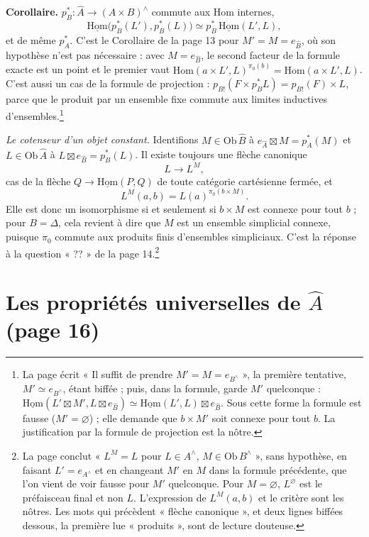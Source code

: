 \documentclass[11pt,a4paper]{article}
\begin{document}
\textbf{Corollaire.} $p_{B}^{*} : \widehat{A} \to (A \times B)^{\wedge}$
commute aux Hom internes,
\[
\underline{\mathrm{Hom}}\bigl(p_{B}^{*}(L'), p_{B}^{*}(L)\bigr) \simeq
p_{B}^{*}\, \underline{\mathrm{Hom}}(L', L),
\]
et de même $p_{A}^{*}$. C'est le Corollaire de la page 13 pour $M' = M =
e_{\widehat{B}}$, où son hypothèse n'est pas nécessaire : avec $M =
e_{\widehat{B}}$, le second facteur de la formule exacte est un point et le
premier vaut $\mathrm{Hom}(a \times L', L)^{\pi_{0}(b)} = \mathrm{Hom}(a
\times L', L)$. C'est aussi un cas de la formule de projection :
$p_{B!}(F \times p_{B}^{*}L) = p_{B!}(F) \times L$, parce que le produit par un
ensemble fixe commute aux limites inductives d'ensembles.\footnote{La page
écrit « Il suffit de prendre $M' = M = e_{B^{\wedge}}$ », la première
tentative, $M' \simeq e_{B^{\wedge}}$, étant biffée ; puis, dans la formule,
garde $M'$ quelconque :
$\underline{\mathrm{Hom}}(L' \boxtimes M', L \boxtimes e_{\widehat{B}}) \simeq
\underline{\mathrm{Hom}}(L', L) \boxtimes e_{\widehat{B}}$. Sous cette forme
la formule est fausse ($M' = \varnothing$) ; elle demande que $b \times M'$
soit connexe pour tout $b$. La justification par la formule de projection est
la nôtre.}

\emph{Le cotenseur d'un objet constant.} Identifions $M \in \mathrm{Ob}\,
\widehat{B}$ à $e_{\widehat{A}} \boxtimes M = p_{A}^{*}(M)$ et $L \in \mathrm{Ob}\,
\widehat{A}$ à $L \boxtimes e_{\widehat{B}} = p_{B}^{*}(L)$. Il existe
toujours une flèche canonique
\[
L \longrightarrow L^{M},
\]
cas de la flèche $Q \to \underline{\mathrm{Hom}}(P, Q)$ de toute catégorie
cartésienne fermée, et
\[
L^{M}(a, b) = L(a)^{\pi_{0}(b \times M)} .
\]
Elle est donc un isomorphisme si et seulement si $b \times M$ est connexe pour
tout $b$ ; pour $B = \Delta$, cela revient à dire que $M$ est un ensemble
simplicial connexe, puisque $\pi_{0}$ commute aux produits finis d'ensembles
simpliciaux. C'est la réponse à la question « ?? » de la page 14.\footnote{La
page conclut « $L^{M} = L$ pour $L \in A^{\wedge}$, $M \in \mathrm{Ob}\,
B^{\wedge}$ », sans hypothèse, en faisant $L' = e_{A^{\wedge}}$ et en changeant
$M'$ en $M$ dans la formule précédente, que l'on vient de voir fausse pour
$M'$ quelconque. Pour $M = \varnothing$, $L^{\varnothing}$ est le préfaisceau
final et non $L$. L'expression de $L^{M}(a, b)$ et le critère sont les nôtres.
Les mots qui précèdent « flèche canonique », et deux lignes biffées dessous,
la première lue « produits », sont de lecture douteuse.}

\section*{Les propriétés universelles de $\widehat{A}$ (page 16)}
\end{document}

